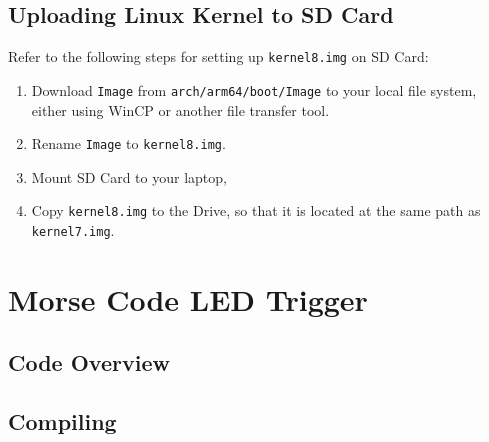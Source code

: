 \documentclass[onecolumn, draftclsnofoot, 10pt, compsoc]{IEEEtran}
\begin{document}
\subsection{Uploading Linux Kernel to SD Card}
Refer to the following steps for setting up \texttt{kernel8.img} on SD Card:
\begin{enumerate}
\item Download \texttt{Image} from \texttt{arch/arm64/boot/Image} to your local file system, either using WinCP or another file transfer tool.
\item Rename \texttt{Image} to \texttt{kernel8.img}.
\item Mount SD Card to your laptop,
\item Copy \texttt{kernel8.img} to the Drive, so that it is located at the same path as \texttt{kernel7.img}.
\end{enumerate}


\section{Morse Code LED Trigger}

\subsection{Code Overview}

\subsection{Compiling}



\clearpage
\medskip


\end{document}
